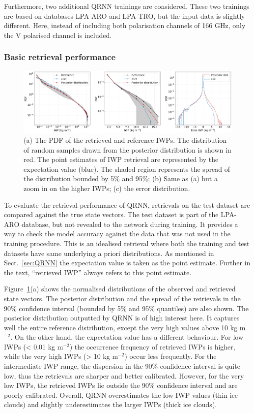 \documentclass[amt, manuscript]{copernicus}
\begin{document}
Furthermore, two additional QRNN trainings are considered. These two trainings are based on databases LPA-ARO and LPA-TRO, but the input data is slightly different. Here, instead of including both polarisation channels of 166\,\,GHz, only the V polarised channel is included.

\subsubsection{Basic retrieval performance}
%
\label{sec:basic_performance}

\begin{figure}[t]
	\includegraphics[width=12cm]{Figures/PDF_IWP_ARO.pdf}
	\caption{(a) The PDF of the retrieved and reference IWPs. The distribution of random samples drawn from the posterior distribution is shown in red. The point estimates of IWP retrieval are represented by the expectation value (blue). The shaded region represents the spread of the distribution bounded by 5\% and 95\%; (b) Same as (a) but a zoom in on the higher IWPs; (c) the error distribution. }
	\label{fig:PDF_IWP_test}
\end{figure}

To evaluate the  retrieval performance of QRNN, retrievals on the test dataset are compared against the true state vectors. The test dataset is part of the LPA-ARO database, but not revealed to the network during training. It provides a way to check the model accuracy against the data that was not used in the training procedure. This is an idealised retrieval where both the training and test datasets have same underlying a priori distributions. As mentioned in Sect.~\ref{sec:QRNN} the expectation value is taken as the point estimate. Further in the text, ``retrieved IWP'' always refers to this point estimate.

Figure~\ref{fig:PDF_IWP_test}(a) shows the normalised distributions of the observed and retrieved state vectors. The posterior distribution and the spread of the retrievals in the 90\% confidence interval (bounded by 5\% and 95\% quantiles) are also shown. The posterior distribution outputted by QRNN is of high interest here. It captures well the entire reference distribution, except the very high values above 10\,\,kg m$^{-2}$.  On the other hand, the expectation value has a different behaviour. For low IWPs (< 0.01\,\,kg m$^{-2}$) the occurrence frequency of retrieved IWPs is higher, while the very high IWPs (> 10\,\,kg m$^{-2}$) occur less frequently. For the intermediate IWP range, the dispersion in the 90\% confidence interval is quite low, thus the retrievals are  sharper and better calibrated. However, for the very low IWPs, the retrieved IWPs lie outside the 90\% confidence interval and are poorly calibrated. Overall, QRNN overestimates the low IWP values (thin ice clouds) and  slightly underestimates the larger IWPs (thick ice clouds).
\end{document}
